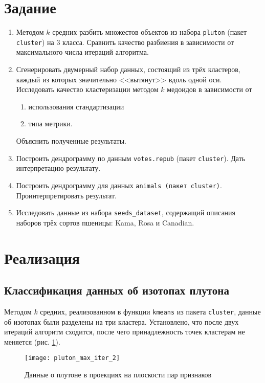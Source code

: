 \documentclass[a4paper,12pt]{article} %
\newcommand{\myPictWidth}{.95\textwidth}
\begin{document}


\section{Задание}

\begin{enumerate}[noitemsep]
    \item Методом $k$ средних разбить множестов объектов из набора \texttt{pluton} (пакет \texttt{cluster}) на 3 класса.
    Сравнить качество разбиения в зависимости от максимального числа итераций алгоритма.
    \item Сгенерировать двумерный набор данных, состоящий из трёх кластеров, каждый из которых значительно <<вытянут>> вдоль одной оси.
    Исследовать качество кластеризации методом $k$ медоидов в зависимости от
    \begin{enumerate}[noitemsep]
        \item использования стандартизации
        \item типа метрики.
    \end{enumerate}
    Объяснить полученные результаты.
    \item Построить дендрограмму по данным \texttt{votes.repub} (пакет \texttt{cluster}). Дать интерпретацию результату.
    \item Построить дендрограмму для данных \texttt{animals (пакет \texttt{cluster})}. Проинтерпретировать результат.
    \item Исследовать данные из набора \texttt{seeds\_dataset}, содержащий описания наборов трёх сортов пшеницы: Kama, Rosa и Canadian.
\end{enumerate}

\newpage
\section{Реализация}

\subsection{Классификация данных об изотопах плутона}

Методом $k$ средних, реализованном в функции \texttt{kmeans} из пакета \texttt{cluster}, данные об изотопах были разделены на три кластера. Установлено, что после двух итераций алгоритм сходится, после чего принадлежность точек кластерам не меняется (рис. \ref{fig:pluton_max_iter_2}).

\begin{figure}[H]
    \centering \texttt{[image: pluton\_max\_iter\_2]}
    \caption{Данные о плутоне в проекциях на плоскости пар признаков}
    \label{fig:pluton_max_iter_2}
\end{figure}
\end{document}
